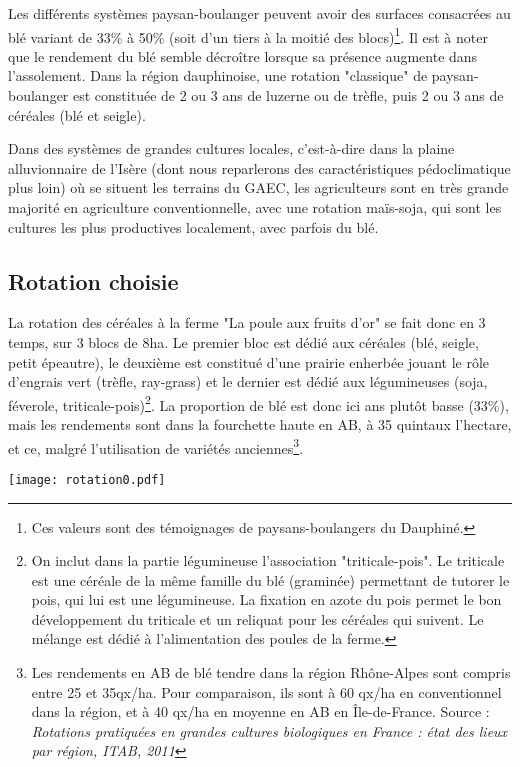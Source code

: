 \documentclass{article}
\begin{document}
 Les différents systèmes paysan-boulanger peuvent avoir des surfaces consacrées au blé variant de 33\% à 50\% (soit d'un tiers à la moitié des blocs)\footnote{Ces valeurs sont des témoignages de paysans-boulangers du Dauphiné.}. Il est à noter que le rendement du blé semble décroître lorsque sa présence augmente dans l'assolement. Dans la région dauphinoise, une rotation "classique" de paysan-boulanger est constituée de 2 ou 3 ans de luzerne ou de trèfle, puis 2 ou 3 ans de céréales (blé et seigle). 

Dans des systèmes de grandes cultures locales, c'est-à-dire dans la plaine alluvionnaire de l'Isère (dont nous reparlerons des caractéristiques pédoclimatique plus loin) où se situent les terrains du GAEC, les agriculteurs sont en très grande majorité en agriculture conventionnelle, avec une rotation maïs-soja, qui sont les cultures les plus productives localement, avec parfois du blé. 

\subsection{Rotation choisie}

La rotation des céréales à la ferme "La poule aux fruits d'or" se fait donc en 3 temps, sur 3 blocs de 8ha. Le premier bloc est dédié aux céréales (blé, seigle, petit épeautre), le deuxième est constitué d'une prairie enherbée jouant le rôle d’engrais vert (trèfle, ray-grass) et le dernier est dédié aux légumineuses (soja, féverole, triticale-pois)\footnote{On inclut dans la partie légumineuse l'association "triticale-pois". Le triticale est une céréale de la même famille du blé (graminée) permettant de tutorer le pois, qui lui est une légumineuse. La fixation en azote du pois permet le bon développement du triticale et un reliquat pour les céréales qui suivent. Le mélange est dédié à l'alimentation des poules de la ferme.}. La proportion de blé est donc ici ans plutôt basse (33\%), mais les rendements sont dans la fourchette haute en AB, à 35 quintaux l'hectare, et ce, malgré l'utilisation de variétés anciennes\footnote{Les rendements en AB de blé tendre dans la région Rhône-Alpes sont compris entre 25 et 35qx/ha. Pour comparaison, ils sont à 60 qx/ha en conventionnel dans la région, et à 40 qx/ha en moyenne en AB en Île-de-France. Source : \textit{Rotations pratiquées en grandes cultures biologiques en France : état des lieux par région, ITAB, 2011}}. 

\begin{center}
	\texttt{[image: rotation0.pdf]}
\end{center}
\end{document}
